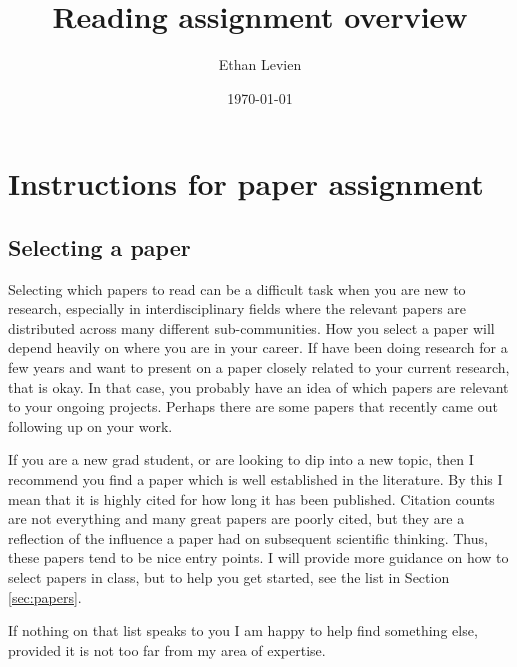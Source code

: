 \documentclass{amsart}
\title{Reading assignment overview}
\author{Ethan Levien}
\date{\today}
\begin{document}
\maketitle


\section{Instructions for paper assignment}

\subsection{Selecting a paper}

Selecting which papers to read can be a difficult task when you are new to research, especially in interdisciplinary fields where the relevant papers are distributed across many different sub-communities. How you select a paper will depend heavily on where you are in your career. If have been doing research for a few years and want to present on a paper closely related to your current research, that is okay. In that case, you probably have an idea of which papers are relevant to your ongoing projects. Perhaps there are some papers that recently came out following up on your work.

If you are a new grad student, or are looking to dip into a new topic, then I recommend you find a paper which is well established in the literature. By this I mean that it is highly cited for how long it has been published.  Citation counts are not everything and many great papers are poorly cited, but they are a reflection of the influence a paper had on subsequent scientific thinking. Thus, these papers tend to be nice entry points. I will provide more guidance on how to select papers in class, but to help you get started, see the list in Section \ref{sec:papers}.

If nothing on that list speaks to you I am happy to help find something else, provided it is not too far from my area of expertise.
\end{document}
